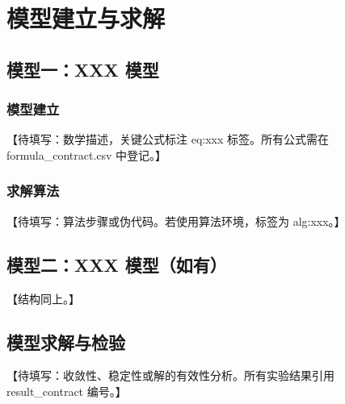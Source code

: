 \section{模型建立与求解}\label{sec:model}


\subsection{模型一：XXX 模型}\label{subsec:model1}

\subsubsection{模型建立}

【待填写：数学描述，关键公式标注 eq:xxx 标签。所有公式需在 formula_contract.csv 中登记。】

\subsubsection{求解算法}

【待填写：算法步骤或伪代码。若使用算法环境，标签为 alg:xxx。】

\subsection{模型二：XXX 模型（如有）}\label{subsec:model2}

【结构同上。】

\subsection{模型求解与检验}\label{subsec:solution_verification}

【待填写：收敛性、稳定性或解的有效性分析。所有实验结果引用 result_contract 编号。】
